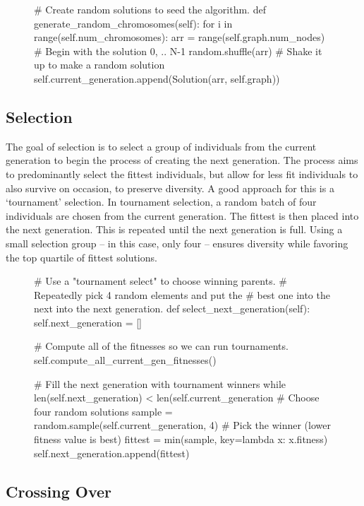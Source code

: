 \begin{figure}[H]
\begin{python}
# Create random solutions to seed the algorithm.
def generate_random_chromosomes(self):
  for i in range(self.num_chromosomes):
    arr = range(self.graph.num_nodes)  # Begin with the solution 0, .. N-1
    random.shuffle(arr)         # Shake it up to make a random solution
    self.current_generation.append(Solution(arr, self.graph))
\end{python}
\end{figure}
 	
\subsection{Selection}

The goal of selection is to select a group of individuals from the current generation to begin the process of creating the next generation. The process aims to predominantly select the fittest individuals, but allow for less fit individuals to also survive on occasion, to preserve diversity. A good approach for this is a `tournament' selection. In tournament selection, a random batch of four individuals are chosen from the current generation. The fittest is then placed into the next generation. This is repeated until the next generation is full. Using a small selection group -- in this case, only four -- ensures diversity while favoring the top quartile of fittest solutions. 

\begin{figure}[H]
\begin{python}
  # Use a "tournament select" to choose winning parents.
  # Repeatedly pick 4 random elements and put the 
  # best one into the next into the next generation.
  def select_next_generation(self):
    self.next_generation = []

    # Compute all of the fitnesses so we can run tournaments.
    self.compute_all_current_gen_fitnesses()

    # Fill the next generation with tournament winners
    while len(self.next_generation) < len(self.current_generation
      # Choose four random solutions
      sample = random.sample(self.current_generation, 4)
      # Pick the winner (lower fitness value is best)
      fittest = min(sample, key=lambda x: x.fitness)
      self.next_generation.append(fittest)	
\end{python}
\end{figure}

\subsection{Crossing Over}


